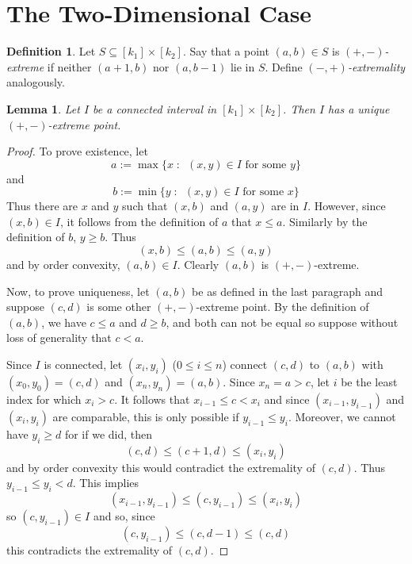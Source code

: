 \documentclass[10pt, a4paper]{article}
\theoremstyle{plain}
\newtheorem{lemma}[theorem]{Lemma}
\theoremstyle{definition}
\newtheorem{definition}[theorem]{Definition}
\begin{document}
\section{The Two-Dimensional Case}

\begin{definition}
 Let $S\subseteq [k_1]\times[k_2]$. Say that a point $(a,b)\in S$ is
 \emph{$(+,-)$-extreme} if neither $(a+1, b)$ nor $(a, b-1)$ lie in $S$.
 Define \emph{$(-, +)$-extremality} analogously.
\end{definition}


\begin{lemma}\label{lem:extremal-points-exist}
  Let $I$ be a connected interval in $[k_1]\times[k_2]$. Then $I$ has a unique
  $(+,-)$-extreme point.
\end{lemma}

\begin{proof}
  To prove existence, let
  \[
    a := \max\{x \;:\;\ (x,y)\in I\text{ for some $y$} \}
  \]
  and
  \[
    b := \min\{y \;:\;\ (x,y)\in I\text{ for some $x$} \}
  \]
  Thus there are $x$ and $y$ such that $(x, b)$ and $(a, y)$ are in $I$.
  However, since $(x, b)\in I$, it follows from the definition of $a$ that
  $x\le a$. Similarly by the definition of $b$, $y\ge b$. Thus
  \[
    (x, b) \le (a,b) \le (a, y)
  \]
  and by order convexity, $(a,b)\in I$. Clearly $(a,b)$ is $(+, -)$-extreme.

  Now, to prove uniqueness, let $(a,b)$ be as defined in the last paragraph and suppose
  $(c,d)$ is some other $(+, -)$-extreme point.
  By the definition of $(a,b)$, we have $c\le a$ and $d\ge b$,
  and both can not be equal so suppose without loss of generality that $c < a$.

  Since $I$ is connected, let $(x_i, y_i)$ ($0\le i\le n$) connect $(c,d)$ to $(a,b)$
  with $(x_0, y_0)=(c,d)$ and $(x_n, y_n)=(a,b)$.
  Since $x_n=a > c$, let $i$ be the least index for which $x_i > c$. It follows that
  $x_{i-1} \le c < x_i$ and since $(x_{i-1}, y_{i-1})$ and $(x_i, y_i)$ are comparable,
  this is only possible if $y_{i-1}\le y_i$.
  Moreover, we cannot have $y_i \ge d$ for if we did, then
  \[
    (c,d) \le (c+1, d) \le (x_i, y_i)
  \]
  and by order convexity this would contradict the extremality of $(c,d)$.
  Thus $y_{i-1} \le y_i<d$. This implies
  \[
    (x_{i-1}, y_{i-1}) \le (c, y_{i-1}) \le (x_i, y_i)
  \]
  so $(c, y_{i-1})\in I$ and so, since
  \[
    (c, y_{i-1}) \le (c, d-1) \le (c,d)
  \]
  this contradicts the extremality of $(c,d)$.
\end{proof}
\end{document}
